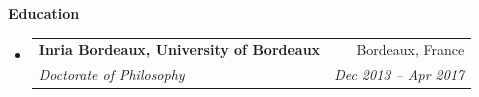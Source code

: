 \documentclass[letterpaper,11pt]{article}
\makeatletter
\newcommand{\resitem}[1]{\item #1 \vspace{-2pt}}
\newcommand{\resheading}[1]{{\large \colorbox{mygrey}{\begin{minipage}{\textwidth}{\textbf{#1 \vphantom{p\^{E}}}}\end{minipage}}}}
\newcommand{\ressubheading}[4]{
\begin{tabular*}{6.5in}{l@{\extracolsep{\fill}}r}
		\textbf{#1} & #2 \\
		\textit{#3} & \textit{#4} \\
\end{tabular*}\vspace{-6pt}}
\makeatother
\begin{document}
\vspace{0.1in} 
\resheading{Education}
	\begin{itemize}
		\item
			\ressubheading{{Inria Bordeaux, University of Bordeaux}}{Bordeaux, France}{{Doctorate of Philosophy}}{Dec 2013 -- Apr 2017}
				

\end{itemize}
\end{document}
